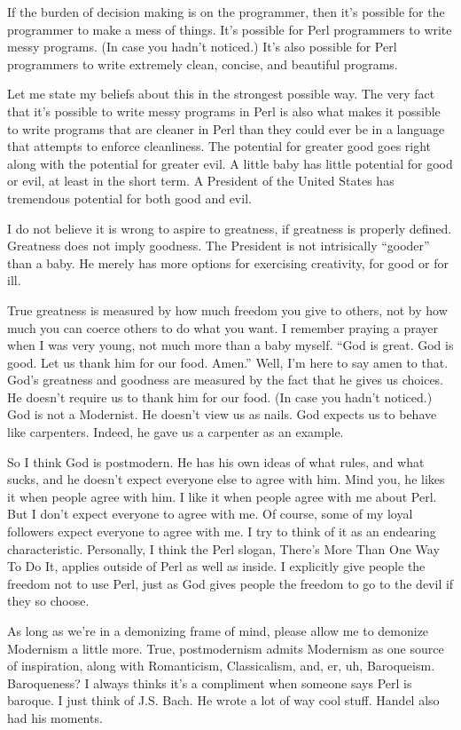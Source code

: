 If the burden of decision making is on the programmer, then it's possible for
the programmer to make a mess of things. It's possible for Perl programmers
to write messy programs. (In case you hadn't noticed.) It's also possible for
Perl programmers to write extremely clean, concise, and beautiful programs.

Let me state my beliefs about this in the strongest possible way. The very
fact that it's possible to write messy programs in Perl is also what makes it
possible to write programs that are cleaner in Perl than they could ever be
in a language that attempts to enforce cleanliness. The potential for greater
good goes right along with the potential for greater evil. A little baby has
little potential for good or evil, at least in the short term. A President of
the United States has tremendous potential for both good and evil.

I do not believe it is wrong to aspire to greatness, if greatness is properly
defined. Greatness does not imply goodness. The President is not intrisically
``gooder'' than a baby. He merely has more options for exercising
creativity, for good or for ill.

True greatness is measured by how much freedom you give to others, not by how
much you can coerce others to do what you want. I remember praying a prayer
when I was very young, not much more than a baby myself. ``God is great. God
is good. Let us thank him for our food. Amen.'' Well, I'm here to say amen
to that. God's greatness and goodness are measured by the fact that he gives
us choices. He doesn't require us to thank him for our food. (In case you
hadn't noticed.) God is not a Modernist. He doesn't view us as nails. God
expects us to behave like carpenters. Indeed, he gave us a carpenter as an
example.

So I think God is postmodern. He has his own ideas of what rules, and what
sucks, and he doesn't expect everyone else to agree with him. Mind you, he
likes it when people agree with him. I like it when people agree with me
about Perl. But I don't expect everyone to agree with me. Of course, some of
my loyal followers expect everyone to agree with me. I try to think of it as
an endearing characteristic. Personally, I think the Perl slogan, There's
More Than One Way To Do It, applies outside of Perl as well as inside. I
explicitly give people the freedom not to use Perl, just as God gives people
the freedom to go to the devil if they so choose.

As long as we're in a demonizing frame of mind, please allow me to demonize
Modernism a little more. True, postmodernism admits Modernism as one source
of inspiration, along with Romanticism, Classicalism, and, er, uh,
Baroqueism. Baroqueness? I always thinks it's a compliment when someone says
Perl is baroque. I just think of J.S. Bach. He wrote a lot of way cool stuff.
Handel also had his moments.

